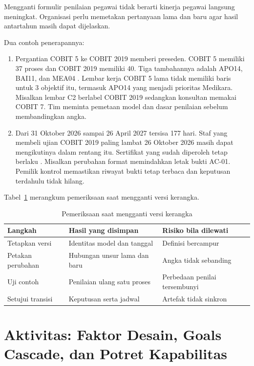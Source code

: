 Mengganti formulir penilaian pegawai tidak berarti kinerja pegawai langsung meningkat. Organisasi perlu memetakan pertanyaan lama dan baru agar hasil antartahun masih dapat dijelaskan.

Dua contoh penerapannya:
\begin{enumerate}
  \item Pergantian COBIT 5 ke COBIT 2019 memberi preseden. COBIT 5 memiliki 37 proses dan COBIT 2019 memiliki 40. Tiga tambahannya adalah APO14, BAI11, dan MEA04
  \cite{c04-perbandingan}. Lembar kerja COBIT 5 lama tidak memiliki baris untuk 3 objektif itu, termasuk APO14 yang menjadi prioritas Medikara. Misalkan lembar C2 berlabel COBIT 2019
  sedangkan konsultan memakai COBIT 7. Tim meminta pemetaan model dan dasar penilaian sebelum membandingkan angka.
  \item Dari 31 Oktober 2026 sampai 26 April 2027 tersisa 177 hari. Staf yang membeli ujian COBIT 2019 paling lambat 26 Oktober 2026 masih dapat mengikutinya dalam rentang itu. Sertifikat yang
  sudah diperoleh tetap berlaku \cite{c04-transisi}. Misalkan perubahan format memindahkan letak bukti AC-01. Pemilik kontrol memastikan riwayat bukti tetap terbaca dan keputusan terdahulu tidak hilang.
\end{enumerate}

Tabel~\ref{tab:ch04-versi} merangkum pemeriksaan saat mengganti versi kerangka.

\begin{table}[!htb]
  \centering\small
  \caption{Pemeriksaan saat mengganti versi kerangka}\label{tab:ch04-versi}
  \begin{tabularx}{\textwidth}{|>{\raggedright\arraybackslash}p{}|>{\raggedright\arraybackslash}X|>{\raggedright\arraybackslash}X|}
    \hline
    \textbf{Langkah} & \textbf{Hasil yang disimpan} & \textbf{Risiko bila dilewati} \\ \hline
    Tetapkan versi & Identitas model dan tanggal & Definisi bercampur \\ \hline
    Petakan perubahan & Hubungan unsur lama dan baru & Angka tidak sebanding \\ \hline
    Uji contoh & Penilaian ulang satu proses & Perbedaan penilai tersembunyi \\ \hline
    Setujui transisi & Keputusan serta jadwal & Artefak tidak sinkron \\ \hline
  \end{tabularx}
\end{table}

\section{Aktivitas: Faktor Desain, Goals Cascade, dan Potret Kapabilitas}

